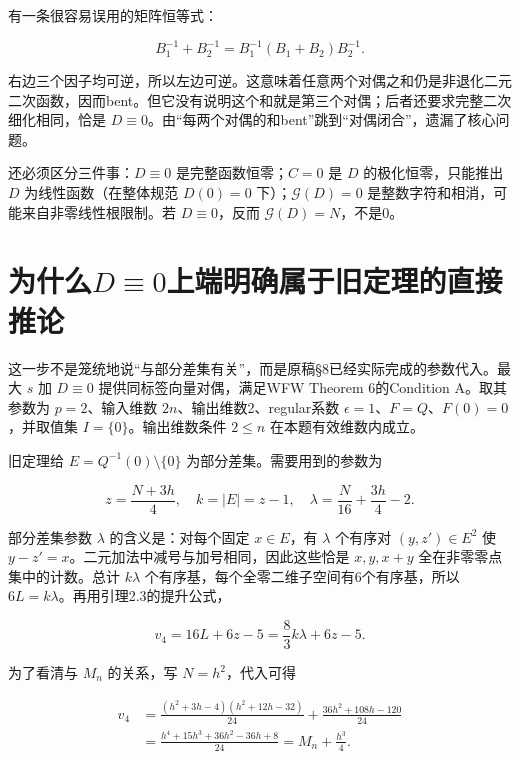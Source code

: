 \documentclass[UTF8,fontset=fandol,zihao=-4,openany,oneside]{ctexbook}
\begin{document}
有一条很容易误用的矩阵恒等式：



\[
B_1^{-1}+B_2^{-1}
=B_1^{-1}(B_1+B_2)B_2^{-1}.
\]



右边三个因子均可逆，所以左边可逆。这意味着任意两个对偶之和仍是非退化二元二次函数，因而bent。但它没有说明这个和就是第三个对偶；后者还要求完整二次细化相同，恰是 \(D\equiv0\)。由“每两个对偶的和bent”跳到“对偶闭合”，遗漏了核心问题。



还必须区分三件事：\(D\equiv0\) 是完整函数恒零；\(C=0\) 是 \(D\) 的极化恒零，只能推出 \(D\) 为线性函数（在整体规范 \(D(0)=0\) 下）；\(\mathcal G(D)=0\) 是整数字符和相消，可能来自非零线性根限制。若 \(D\equiv0\)，反而 \(\mathcal G(D)=N\)，不是0。



\section{为什么\texorpdfstring{\(D\equiv0\)}{Dequiv0}上端明确属于旧定理的直接推论}


这一步不是笼统地说“与部分差集有关”，而是原稿§8已经实际完成的参数代入。最大 \(s\) 加 \(D\equiv0\) 提供同标签向量对偶，满足WFW Theorem 6的Condition A。取其参数为 \(p=2\)、输入维数 \(2n\)、输出维数2、regular系数 \(\epsilon=1\)、\(F=Q\)、\(F(0)=0\)，并取值集 \(I=\{0\}\)。输出维数条件 \(2\le n\) 在本题有效维数内成立。



旧定理给 \(E=Q^{-1}(0)\setminus\{0\}\) 为部分差集。需要用到的参数为



\[
z=\frac{N+3h}{4},\quad k=|E|=z-1,
\quad\lambda=\frac N{16}+\frac{3h}{4}-2.
\]



部分差集参数 \(\lambda\) 的含义是：对每个固定 \(x\in E\)，有 \(\lambda\) 个有序对 \((y,z')\in E^2\) 使 \(y-z'=x\)。二元加法中减号与加号相同，因此这些恰是 \(x,y,x+y\) 全在非零零点集中的计数。总计 \(k\lambda\) 个有序基，每个全零二维子空间有6个有序基，所以 \(6L=k\lambda\)。再用引理2.3的提升公式，



\[
v_4=16L+6z-5=\frac83 k\lambda+6z-5.
\]



为了看清与 \(M_n\) 的关系，写 \(N=h^2\)，代入可得



\[
\begin{aligned}
v_4
&=\frac{(h^2+3h-4)(h^2+12h-32)}{24}
+\frac{36h^2+108h-120}{24}\\
&=\frac{h^4+15h^3+36h^2-36h+8}{24}
=M_n+\frac{h^3}{4}.
\end{aligned}
\]
\end{document}
